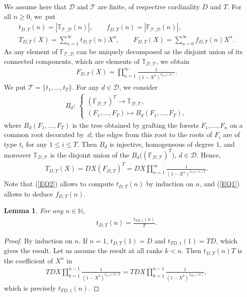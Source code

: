 \documentclass[10pt,a4paper]{amsart}
\numberwithin{equation}{section}
\newtheorem{Lemma}[Theorem]{Lemma}
\newcommand{\T}{\mathcal{T}}
\newcommand{\D}{\mathcal{D}}
\newcommand{\N}{\mathbb{N}}
\newcommand{\bfT}{\mathbb{T}}
\newcommand{\bfF}{\mathbb{F}}
\begin{document}
We assume here that $\D$ and $\T$ are finite, of respective cardinality $D$ and $T$. For all $n\geq 0$, we~put
\begin{gather*}
t_{D,T}(n)=|\bfT_{\T,\D}(n)|,\qquad f_{D,T}(n)=|\bfF_{\T,\D}(n)|,
\\
T_{D,T}(X)=\sum_{n=1}^\infty t_{D,T}(n)X^n,\qquad F_{D,T}(X)=\sum_{n=0}^\infty f_{D,T}(n)X^n.
\end{gather*}
As any element of $\bfF_{\T,\D}$ can be uniquely decomposed as the disjoint union of its connected components, which are
elements of $\bfT_{\D,\T}$, we obtain
\begin{gather}
\label{EQ1}
F_{D,T}(X)=\prod_{n=1}^\infty \frac{1}{(1-X^n)^{t_{D,T}(n)}}.
\end{gather}
We put $\T=\{t_1,\dots,t_T\}$. For any $d\in \D$, we consider
\begin{gather*}
B_d\colon\ \begin{cases}
(\bfF_{\D,\T})^T\longrightarrow \bfT_{\D,\T},
\\
(F_1,\dots,F_T)\longmapsto B_d(F_1,\dots,F_T),
\end{cases}
\end{gather*}
where $B_d(F_1,\dots,F_T)$ is the tree obtained by grafting the forests $F_1,\dots,F_n$
on a common root decorated by~$d$;
the edges from this root to the roots of $F_i$ are of type $t_i$ for any $1\leq i\leq T$.
Then $B_d$ is injective, homogeneous of degree $1$, and moreover $\bfT_{\D,\T}$
is the disjoint union of the $B_d\big((\bfF_{\D,\T})^T\big)$, $d\in \D$. Hence,
\begin{gather}
\label{EQ2} T_{D,T}(X)=DX (F_{D,T})^T=DX\prod_{n=1}^\infty\frac{1}{(1-X^n)^{t_{D,T}(n)T}}.
\end{gather}
Note that (\ref{EQ2}) allows to compute $t_{D,T}(n)$ by induction on $n$,
and (\ref{EQ1}) allows to deduce $f_{D,T}(n)$.

\begin{Lemma}
For any $n\in \N$,
\begin{gather*}
t_{D,T}(n)=\frac{t_{TD,1}(n)}{T}.
\end{gather*}
\end{Lemma}

\begin{proof} By induction on $n$. If $n=1$, $t_{D,T}(1)=D$ and $t_{TD,1}(1)=TD$, which gives the result.
Let us assume the result at all ranks $k<n$.
Then $t_{D,T}(n)T$ is the coefficient of $X^n$ in
\begin{gather*}
TDX\prod_{k=1}^{n-1}\frac{1}{(1-X^k)^{t_{D,T}(k)T}}
=TDX\prod_{k=1}^{n-1}\frac{1}{(1-X^k)^{t_{TD,1}(k)}},
\end{gather*}
which is precisely $t_{TD,1}(n)$.
\end{proof}
\end{document}
